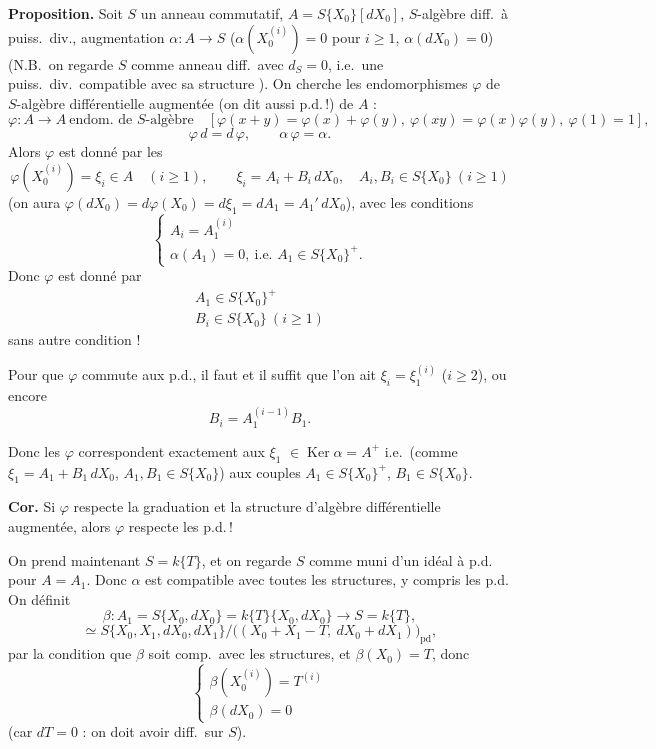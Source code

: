 \documentclass[11pt,a4paper]{article}
\begin{document}
\textbf{Proposition.} Soit $S$ un anneau commutatif, $A = S\{X_0\}[dX_0]$,
 $S$-algèbre diff.\ à puiss.\ div., augmentation
$\alpha : A \to S$ ($\alpha(X_0^{(i)}) = 0$ pour $i \geqslant 1$,
$\alpha(dX_0) = 0$) (N.B.\ on regarde $S$ comme anneau diff.\ avec $d_S = 0$,
i.e.\ une puiss.\ div.\ compatible avec sa structure \ill{}). On cherche les
endomorphismes $\varphi$ de $S$-algèbre différentielle augmentée (on dit aussi
p.d.\,!) \struck{\ill{}} de $A$ :
\[
  \varphi : A \to A \ \text{endom.\ de $S$-algèbre}
  \quad [\varphi(x+y) = \varphi(x) + \varphi(y),\ \varphi(xy) = \varphi(x)\varphi(y),\ \varphi(1) = 1],
\]
\[
  \varphi\, d = d\, \varphi , \qquad \alpha\,\varphi = \alpha .
\]
Alors $\varphi$ est donné par les
\[
  \varphi(X_0^{(i)}) = \xi_i \in A \quad (i \geqslant 1),
  \qquad \xi_i = A_i + B_i\,dX_0 , \quad A_i, B_i \in S\{X_0\} \ (i \geqslant 1)
\]
(on aura $\varphi(dX_0) = d\varphi(X_0) = d\xi_1 = dA_1 = A_1'\,dX_0$), avec les conditions
\[
  \begin{cases}
    A_i = A_1^{(i)} \\
    \alpha(A_1) = 0 , \ \text{i.e. } A_1 \in S\{X_0\}^{+} .
  \end{cases}
\]
Donc $\varphi$ est donné par
\[
  \boxed{\begin{array}{l} A_1 \in S\{X_0\}^{+} \\ B_i \in S\{X_0\} \ (i \geqslant 1) \end{array}}
\]
sans autre condition !

Pour que $\varphi$ commute aux p.d., il faut et il suffit que l'on ait
$\xi_i = \xi_1^{(i)}$ ($i \geqslant 2$), ou encore
\[
  B_i = A_1^{(i-1)} B_1 .
\]

Donc les $\varphi$ correspondent exactement aux
$\xi_1$  $\in \operatorname{Ker}\alpha = A^{+}$
i.e.\ (comme $\xi_1 = A_1 + B_1\,dX_0$, $A_1, B_1 \in S\{X_0\}$)
aux couples $A_1 \in S\{X_0\}^{+}$, $B_1 \in S\{X_0\}$.

\textbf{Cor.} Si $\varphi$ respecte la graduation et la structure d'algèbre
différentielle augmentée, alors $\varphi$ respecte les p.d.\,!

On prend maintenant $S = k\{T\}$, et on regarde $S$ comme muni d'un idéal à
p.d.\  pour $A = A_1$. Donc $\alpha$ est compatible avec toutes les structures, y
compris les p.d. On définit
\[
  \beta : A_1 = S\{X_0, dX_0\} = k\{T\}\{X_0, dX_0\} \longrightarrow S = k\{T\} ,
\]
\[
  {} \simeq S\{X_0, X_1, dX_0, dX_1\}/\bigl((X_0 + X_1 - T,\ dX_0 + dX_1)\bigr)_{\mathrm{pd}} ,
\]
par la condition que $\beta$ soit comp.\ avec les structures, et $\beta(X_0) = T$, donc
\[
  \begin{cases}
    \beta(X_0^{(i)}) = T^{(i)} \\
    \beta(dX_0) = 0
  \end{cases}
\]
(car $dT = 0$ \ill{} : on doit avoir \ill{} diff.\ sur $S$).
\end{document}
